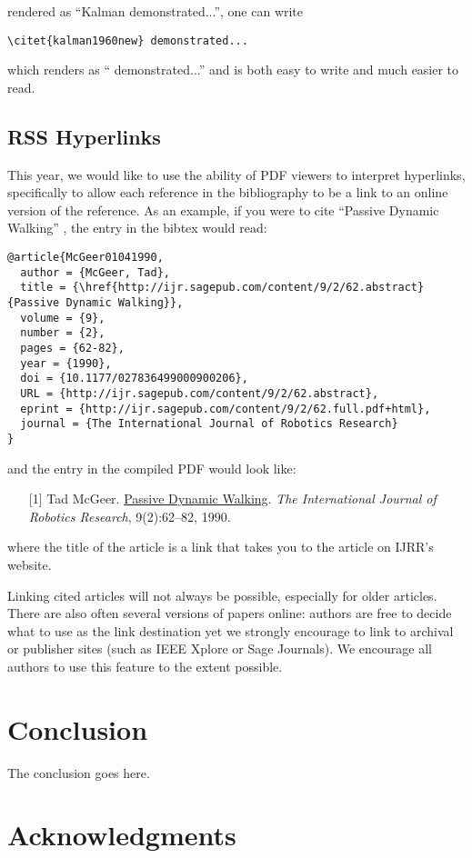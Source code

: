 \documentclass[conference]{IEEEtran}
\begin{document}
\noindent
rendered as 
``Kalman \cite{kalman1960new} demonstrated...'', 
one can
write 

{\small
\begin{verbatim}
\citet{kalman1960new} demonstrated... 
\end{verbatim}
}
\noindent
which renders as ``\citet{kalman1960new} demonstrated...'' and is 
both easy to write and much easier to read.
  
\subsection{RSS Hyperlinks}

This year, we would like to use the ability of PDF viewers to interpret
hyperlinks, specifically to allow each reference in the bibliography to be a
link to an online version of the reference. 
As an example, if you were to cite ``Passive Dynamic Walking''
\cite{McGeer01041990}, the entry in the bibtex would read:

{\small
\begin{verbatim}
@article{McGeer01041990,
  author = {McGeer, Tad}, 
  title = {\href{http://ijr.sagepub.com/content/9/2/62.abstract}{Passive Dynamic Walking}}, 
  volume = {9}, 
  number = {2}, 
  pages = {62-82}, 
  year = {1990}, 
  doi = {10.1177/027836499000900206}, 
  URL = {http://ijr.sagepub.com/content/9/2/62.abstract}, 
  eprint = {http://ijr.sagepub.com/content/9/2/62.full.pdf+html}, 
  journal = {The International Journal of Robotics Research}
}
\end{verbatim}
}
\noindent
and the entry in the compiled PDF would look like:

\def\tmplabel#1{[#1]}

\begin{enumerate}
\item[\tmplabel{1}] Tad McGeer. \href{http://ijr.sagepub.com/content/9/2/62.abstract}{Passive Dynamic
Walking}. {\em The International Journal of Robotics Research}, 9(2):62--82,
1990.
\end{enumerate}
%
where the title of the article is a link that takes you to the article on IJRR's website. 


Linking cited articles will not always be possible, especially for
older articles. There are also often several versions of papers
online: authors are free to decide what to use as the link destination
yet we strongly encourage to link to archival or publisher sites
(such as IEEE Xplore or Sage Journals).  We encourage all authors to use this feature to
the extent possible.

\section{Conclusion} 
\label{sec:conclusion}

The conclusion goes here.

\section*{Acknowledgments}




\end{document}
